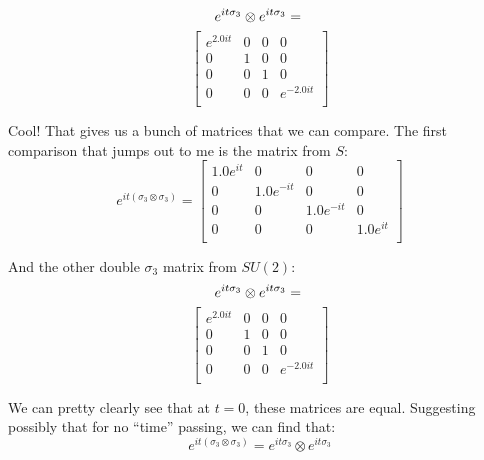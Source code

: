 \documentclass{article}
\begin{document}
\[ e^{it\sigma_3} \otimes e^{it\sigma_3} = \\ \] \[ \left[
    \begin{array}{cccc}
    e^{2.0it} & 0 & 0 & 0 \\
    0 & 1 & 0 & 0 \\
    0 & 0 & 1 & 0 \\
    0 & 0 & 0 & e^{-2.0it} \\
    \end{array}
    \right] \]

Cool! That gives us a bunch of matrices that we can compare. The first comparison that jumps out to me is the matrix from $S$: 
\[ e^{it(\sigma_3 \otimes \sigma_3)} = \left[
    \begin{array}{cccc}
    1.0e^{it} & 0 & 0 & 0 \\
    0 & 1.0e^{-it} & 0 & 0 \\
    0 & 0 & 1.0e^{-it} & 0 \\
    0 & 0 & 0 & 1.0e^{it} \\
    \end{array}
    \right] \]

And the other double $\sigma_3$ matrix from $SU(2)$:
\[ e^{it\sigma_3} \otimes e^{it\sigma_3} = \\ \] \[ \left[
    \begin{array}{cccc}
    e^{2.0it} & 0 & 0 & 0 \\
    0 & 1 & 0 & 0 \\
    0 & 0 & 1 & 0 \\
    0 & 0 & 0 & e^{-2.0it} \\
    \end{array}
    \right] \]

We can pretty clearly see that at $t=0$, these matrices are equal. Suggesting possibly that for no ``time'' passing, we can find that: 
\[ e^{it(\sigma_3 \otimes \sigma_3)} = e^{it\sigma_3} \otimes e^{it\sigma_3} \]
\end{document}
